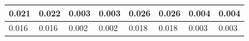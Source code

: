 \begin{table}[H]
\begin{tabular}{|llllllll|}
    \multicolumn{1}{|l|}{0.021} & \multicolumn{1}{l|}{0.022} & \multicolumn{1}{l|}{0.003} & \multicolumn{1}{l|}{0.003} & \multicolumn{1}{l|}{0.026} & \multicolumn{1}{l|}{0.026} & \multicolumn{1}{l|}{0.004}   & \multicolumn{1}{l|}{0.004}  \\ \hline
    \multicolumn{1}{|l|}{0.016} & \multicolumn{1}{l|}{0.016} & \multicolumn{1}{l|}{0.002} & \multicolumn{1}{l|}{0.002} & \multicolumn{1}{l|}{0.018} & \multicolumn{1}{l|}{0.018} & \multicolumn{1}{l|}{0.003}   & \multicolumn{1}{l|}{0.003} \\ \hline
    \end{tabular}
\end{table}

